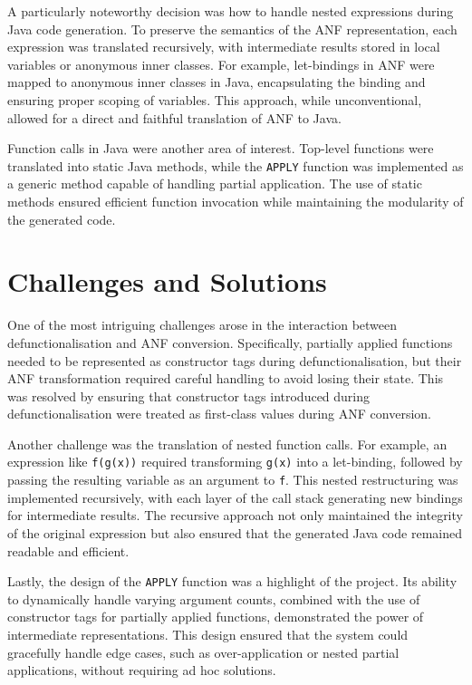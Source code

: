 A particularly noteworthy decision was how to handle nested expressions during Java code generation. To preserve the semantics of the ANF representation, each expression was translated recursively, with intermediate results stored in local variables or anonymous inner classes. For example, let-bindings in ANF were mapped to anonymous inner classes in Java, encapsulating the binding and ensuring proper scoping of variables. This approach, while unconventional, allowed for a direct and faithful translation of ANF to Java.

Function calls in Java were another area of interest. Top-level functions were translated into static Java methods, while the \texttt{APPLY} function was implemented as a generic method capable of handling partial application. The use of static methods ensured efficient function invocation while maintaining the modularity of the generated code.

\section{Challenges and Solutions}
One of the most intriguing challenges arose in the interaction between defunctionalisation and ANF conversion. Specifically, partially applied functions needed to be represented as constructor tags during defunctionalisation, but their ANF transformation required careful handling to avoid losing their state. This was resolved by ensuring that constructor tags introduced during defunctionalisation were treated as first-class values during ANF conversion.

Another challenge was the translation of nested function calls. For example, an expression like \texttt{f(g(x))} required transforming \texttt{g(x)} into a let-binding, followed by passing the resulting variable as an argument to \texttt{f}. This nested restructuring was implemented recursively, with each layer of the call stack generating new bindings for intermediate results. The recursive approach not only maintained the integrity of the original expression but also ensured that the generated Java code remained readable and efficient.

Lastly, the design of the \texttt{APPLY} function was a highlight of the project. Its ability to dynamically handle varying argument counts, combined with the use of constructor tags for partially applied functions, demonstrated the power of intermediate representations. This design ensured that the system could gracefully handle edge cases, such as over-application or nested partial applications, without requiring ad hoc solutions.

